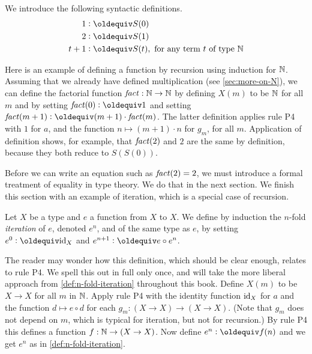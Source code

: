 We introduce the following syntactic definitions.
\begin{align*}
 1 & \defeq S(0) \\
 2 & \defeq S(1) \\
 t+1 & \defeq S(t),\text{~for any term $t$ of type $\NN$}
\end{align*}

Here is an example of defining a function by recursion using induction for $\mathbb{N}$.
Assuming that we already have defined multiplication
(see \cref{sec:more-on-N}), we can define the factorial 
function $\mathop{\mathit{fact}} : \mathbb{N} \to \mathbb{N}$ by defining $X(m)$ to be $\mathbb{N}$ for all $m$ and 
by setting $\fact(0) \defeq 1$ and setting $\fact(m+1) \defeq (m+1) \cdot \fact(m)$.
The latter definition applies rule P4 with $1$ for $a$,
and the function $n \mapsto (m+1) \cdot n$ for $g_m$, for all $m$. 
Application of definition shows, for example,
that $\mathop{\mathit{fact}}(2)$ and $2$ are the same by definition,
because they both reduce to $S(S(0))$.

Before we can write an equation such as $\mathop{\mathit{fact}}(2)=2$, 
we must introduce a formal treatment of equality in type theory.  
We do that in the next section.
We finish this section with an example of iteration,
which is a special case of recursion. 

\begin{definition}\label{def:n-fold-iteration}
Let $X$ be a type and $e$ a function from $X$ to $X$. 
We define by induction the $n$-fold \emph{iteration} of $e$,
denoted $e^n$, and of the same type as $e$,
by setting $e^0 \defeq \id_X$ and $e^{n+1}\defeq e\circ e^n$.
\end{definition}

The reader may wonder how this definition, 
which should be clear enough, relates to rule P4.
We spell this out in full only once, and will take
the more liberal approach from \cref{def:n-fold-iteration}
throughout this book.
Define $X(m)$ to be $X\to X$ for all $m$ in $\mathbb{N}$.
Apply rule P4 with the identity function $\mathord{\mathrm{id}}_X$ for $a$
and the function $d \mapsto e\circ d$ for each
$g_m : (X\to X)\to(X\to X)$. (Note that $g_m$ does not depend on $m$, 
which is typical for iteration, but not for recursion.) 
By rule P4 this defines a function $f: \mathbb{N}\to(X\to X)$. 
Now define $e^n \defeq f(n)$ and we get $e^n$ as in
\cref{def:n-fold-iteration}.


